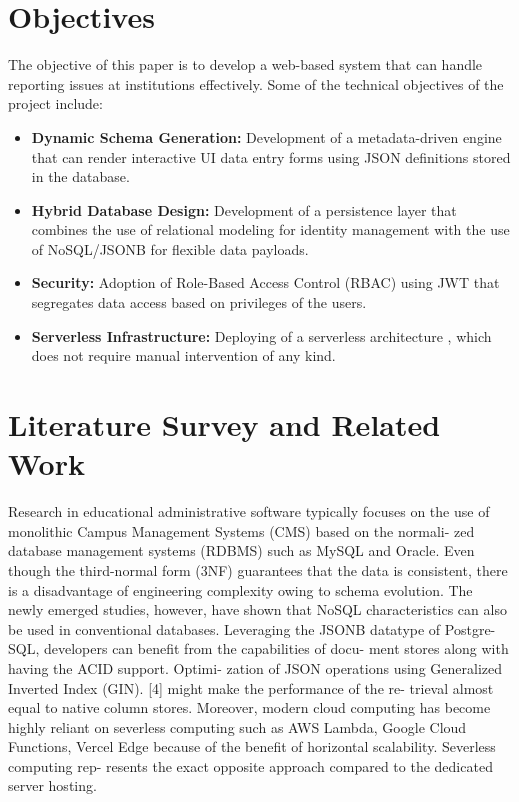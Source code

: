 \documentclass[conference]{IEEEtran}
\begin{document}
\section{Objectives}
The objective of this paper is to develop a web-based system that can handle reporting issues at institutions effectively. Some of the technical objectives of the project include:
\begin{itemize}
    \item \textbf{Dynamic Schema Generation:} Development of a metadata-driven engine that can render interactive UI data entry forms using JSON definitions stored in the database.
    \item \textbf{Hybrid Database Design:} Development of a persistence layer that combines the use of relational modeling for identity management with the use of NoSQL/JSONB for flexible data payloads.
    \item \textbf{Security:} Adoption of Role-Based Access Control (RBAC) using JWT that segregates data access based on privileges of the users.
    \item \textbf{Serverless Infrastructure:} Deploying of a serverless architecture , which does not require manual intervention of any kind.
\end{itemize}

\section{Literature Survey and Related Work}

Research in educational administrative software
typically focuses on the use of monolithic Campus
Management Systems (CMS) based on the normali-
zed database management systems (RDBMS) such
as MySQL and Oracle. Even though the third-normal
form (3NF) guarantees that the data is consistent, there
is a disadvantage of engineering complexity owing to
schema evolution.
The newly emerged studies, however, have shown that
NoSQL characteristics can also be used in conventional
databases. Leveraging the JSONB datatype of Postgre-
SQL, developers can benefit from the capabilities of docu-
ment stores along with having the ACID support. Optimi-
zation of JSON operations using Generalized Inverted
Index (GIN). [4] might make the performance of the re-
trieval almost equal to native column stores.
Moreover, modern cloud computing has become highly
reliant on severless computing such as AWS Lambda,
Google Cloud Functions, Vercel Edge because of the
benefit of horizontal scalability. Severless computing rep-
resents the exact opposite approach compared to the
dedicated server hosting.
\end{document}
